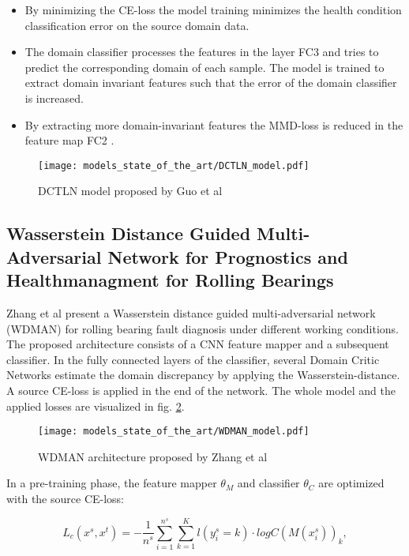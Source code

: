 \begin{itemize}
    \item [\textbf{Objective 1}:] By minimizing the CE-loss the model training minimizes the health condition classification error on the source domain data.
    \item [\textbf{Objective 2}:] The domain classifier processes the features in the layer FC3 and tries to predict the corresponding domain of each sample. The model is trained to extract domain invariant features such that the error of the domain classifier is increased.
    \item [\textbf{Objective 3}:] By extracting more domain-invariant features the MMD-loss is reduced in the feature map FC2 \cite{Guo2019}. 
\end{itemize}


\begin{figure}[H]
  \centering
  \texttt{[image: models\_state\_of\_the\_art/DCTLN\_model.pdf]}
  \caption{DCTLN model proposed by Guo et al \cite{Guo2019}}
  \label{fig:DCTLN_model}
\end{figure}


\subsection{Wasserstein Distance Guided Multi-Adversarial Network for Prognostics and Healthmanagment for Rolling Bearings}
Zhang et al \cite{Zhang2019} present a Wasserstein distance guided multi-adversarial network (WDMAN) for rolling bearing fault diagnosis under different working conditions. The proposed architecture consists of a CNN feature mapper and a subsequent classifier. In the fully connected layers of the classifier, several Domain Critic Networks estimate the domain discrepancy by applying the Wasserstein-distance. A source CE-loss is applied in the end of the network. The whole model and the applied losses are visualized in fig. \ref{fig:WDMAN_model}.

 \begin{figure}[H]
  \centering
  \texttt{[image: models\_state\_of\_the\_art/WDMAN\_model.pdf]}
  \caption{WDMAN architecture proposed by Zhang et al \cite{Zhang2019}}
  \label{fig:WDMAN_model}
\end{figure}

In a pre-training phase, the feature mapper $\theta_{M}$ and classifier $\theta_{C}$ are optimized with the source CE-loss:
 
\begin{equation}
     L_{c}(x^{s}, x^{t}) = -\frac{1}{n^{s}} \sum_{i=1}^{n^{s}} \sum_{k=1}^{K} l(y_{i}^{s}=k) \cdot logC(M(x_{i}^{s}))_{k},
\end{equation}


